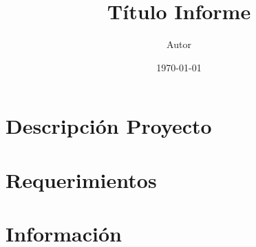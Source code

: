 \documentclass[letter, 10pt]{article}
\begin{document}
\title{Título Informe}
\author{Autor}
\date{\today}
\maketitle

\section{Descripción Proyecto}


\section{Requerimientos}


\section{Información}

\end{document}
